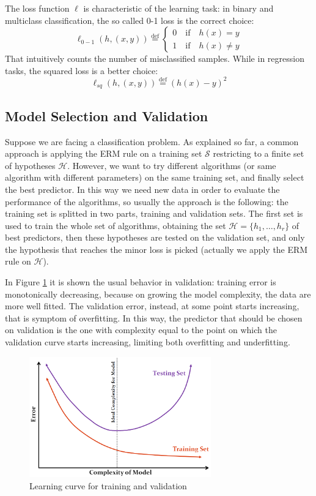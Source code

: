 The loss function $\ell$ is characteristic of the learning task: in binary and multiclass classification, the so called 0-1 loss is the correct choice:
\[\ell_{0-1}(h, (x,y)) \stackrel{\text{def}}{=} 
	\begin{cases}
		0 \quad \textrm{if} \quad  h(x) = y\\
		1 \quad \textrm{if} \quad  h(x) \neq y
	\end{cases}\]
That intuitively counts the number of misclassified samples. While in regression tasks, the squared loss is a better choice:
\[\ell_{sq}(h,(x,y)) \stackrel{\text{def}}{=} (h(x)-y)^2\]




\subsection{Model Selection and Validation}
Suppose we are facing a classification problem. As explained so far, a common approach is applying the \ac{ERM} rule on a training set $\mathcal{S}$ restricting to a finite set of hypotheses $\mathcal{H}$. However, we want to try different algorithms (or same algorithm with different parameters) on the same training set, and finally select the best predictor. In this way we need new data in order to evaluate the performance of the algorithms, so usually the approach is the following: the training set is splitted in two parts, training and validation sets. The first set is used to train the whole set of algorithms, obtaining the set $\mathcal{H} = \{h_1, \dots, h_r\}$ of best predictors, then these hypotheses are tested on the validation set, and only the hypothesis that reaches the minor loss is picked (actually we apply the \ac{ERM} rule on $\mathcal{H}$).

In Figure \ref{fig:valid-curve} it is shown the usual behavior in validation: training error is monotonically decreasing, because on growing the model complexity, the data are more well fitted. The validation error, instead, at some point starts increasing, that is symptom of overfitting. In this way, the predictor that should be chosen on validation is the one with complexity equal to the point on which the validation curve starts increasing, limiting both overfitting and underfitting.
\begin{figure}
	\centering
	\includegraphics[width=0.7\textwidth]{figures/validation-lern-curve.png}
	\caption{Learning curve for training and validation}
	\label{fig:valid-curve}
\end{figure}

